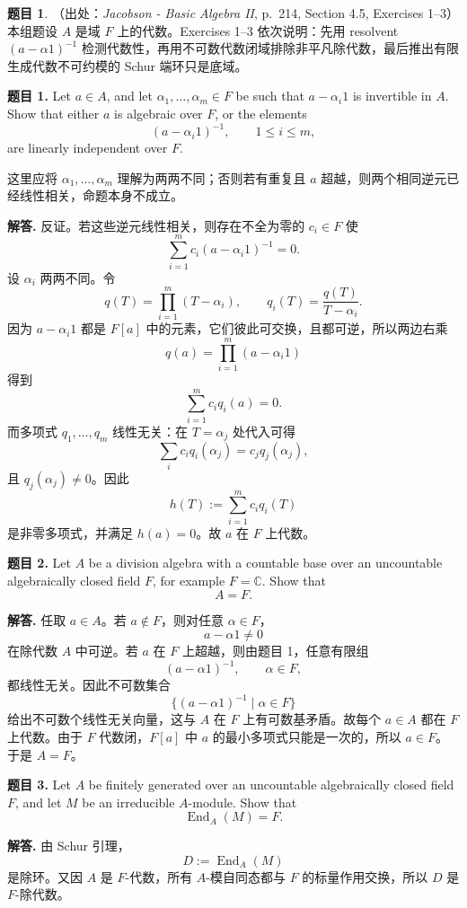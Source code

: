 \documentclass[a4paper]{ctexart}
\theoremstyle{definition}
\newtheorem{example}{题目}[section]
\theoremstyle{analysis}
\theoremstyle{plain}
\begin{document}
\begin{example}
（出处：\textit{Jacobson - Basic Algebra II}, p.~214, Section 4.5, Exercises 1--3）
本组题设 \(A\) 是域 \(F\) 上的代数。Exercises 1--3 依次说明：先用 resolvent
\((a-\alpha 1)^{-1}\) 检测代数性，再用不可数代数闭域排除非平凡除代数，最后推出有限生成代数不可约模的 Schur 端环只是底域。

\textbf{题目 1.}
Let \(a\in A\), and let \(\alpha_1,\ldots,\alpha_m\in F\) be such that
\(a-\alpha_i1\) is invertible in \(A\). Show that either \(a\) is algebraic over
\(F\), or the elements
\[
  (a-\alpha_i1)^{-1},\qquad 1\le i\le m,
\]
are linearly independent over \(F\).

这里应将 \(\alpha_1,\ldots,\alpha_m\) 理解为两两不同；否则若有重复且 \(a\) 超越，则两个相同逆元已经线性相关，命题本身不成立。

\textbf{解答.}
反证。若这些逆元线性相关，则存在不全为零的 \(c_i\in F\) 使
\[
  \sum_{i=1}^m c_i(a-\alpha_i1)^{-1}=0.
\]
设 \(\alpha_i\) 两两不同。令
\[
  q(T)=\prod_{i=1}^m (T-\alpha_i),
  \qquad
  q_i(T)=\frac{q(T)}{T-\alpha_i}.
\]
因为 \(a-\alpha_i1\) 都是 \(F[a]\) 中的元素，它们彼此可交换，且都可逆，所以两边右乘
\[
  q(a)=\prod_{i=1}^m(a-\alpha_i1)
\]
得到
\[
  \sum_{i=1}^m c_iq_i(a)=0.
\]
而多项式 \(q_1,\ldots,q_m\) 线性无关：在 \(T=\alpha_j\) 处代入可得
\[
  \sum_i c_iq_i(\alpha_j)=c_jq_j(\alpha_j),
\]
且 \(q_j(\alpha_j)\neq 0\)。因此
\[
  h(T):=\sum_{i=1}^m c_iq_i(T)
\]
是非零多项式，并满足 \(h(a)=0\)。故 \(a\) 在 \(F\) 上代数。

\textbf{题目 2.}
Let \(A\) be a division algebra with a countable base over an uncountable
algebraically closed field \(F\), for example \(F=\mathbb C\). Show that
\[
  A=F.
\]

\textbf{解答.}
任取 \(a\in A\)。若 \(a\notin F\)，则对任意 \(\alpha\in F\)，
\[
  a-\alpha1\neq 0
\]
在除代数 \(A\) 中可逆。若 \(a\) 在 \(F\) 上超越，则由题目 1，任意有限组
\[
  (a-\alpha1)^{-1},\qquad \alpha\in F,
\]
都线性无关。因此不可数集合
\[
  \{(a-\alpha1)^{-1}\mid \alpha\in F\}
\]
给出不可数个线性无关向量，这与 \(A\) 在 \(F\) 上有可数基矛盾。故每个
\(a\in A\) 都在 \(F\) 上代数。由于 \(F\) 代数闭，\(F[a]\) 中 \(a\) 的最小多项式只能是一次的，所以 \(a\in F\)。于是 \(A=F\)。

\textbf{题目 3.}
Let \(A\) be finitely generated over an uncountable algebraically closed field
\(F\), and let \(M\) be an irreducible \(A\)-module. Show that
\[
  \operatorname{End}_A(M)=F.
\]

\textbf{解答.}
由 Schur 引理，
\[
  D:=\operatorname{End}_A(M)
\]
是除环。又因 \(A\) 是 \(F\)-代数，所有 \(A\)-模自同态都与 \(F\) 的标量作用交换，所以 \(D\) 是 \(F\)-除代数。


\end{example}
\end{document}
